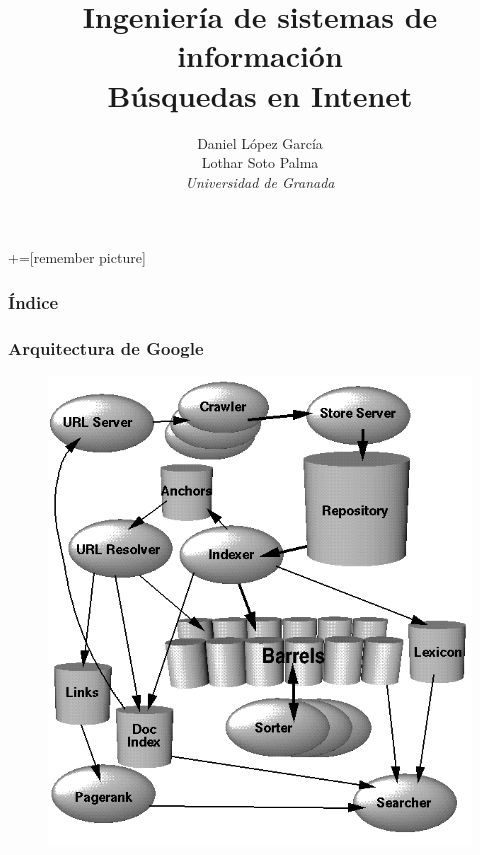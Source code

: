\documentclass[9pt]{beamer} %
\author[Universidad de Granada]{Daniel López García\\ Lothar Soto Palma\\\textit{Universidad de Granada}}
\title{Ingeniería de sistemas de información\\ Búsquedas en Intenet}
\begin{document}
+=[remember picture]

\everymath{\displaystyle}

\begin{frame}
\titlepage
\end{frame}

\begin{frame}
\frametitle{Índice}
\tableofcontents
\end{frame}
\begin{frame}
	\frametitle{Arquitectura de Google}
	\begin{figure}
	\includegraphics[scale=0.33]{img/google_architecture.png}
\end{figure}
	\end{frame}
\end{document}
